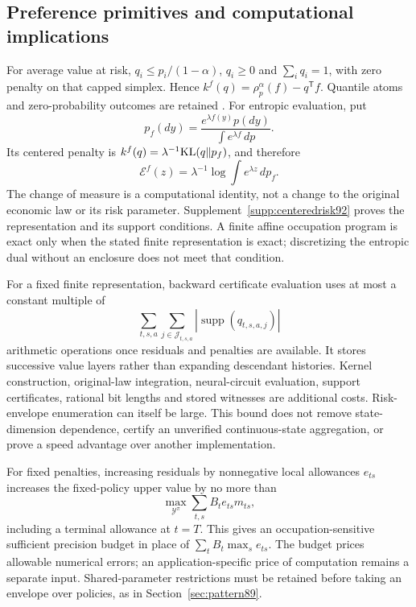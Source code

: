 \subsection{Preference primitives and computational implications}
For average value at risk, $q_i\le p_i/(1-\alpha)$, $q_i\ge0$ and $\sum_iq_i=1$, with zero penalty on that capped simplex. Hence $k^f(q)=\rho_p^\alpha(f)-q^{\mathsf T}f$. Quantile atoms and zero-probability outcomes are retained \citep{rockafellaruryasev2002}. For entropic evaluation, put
\[
 p_f(dy)=\frac{e^{\lambda f(y)}p(dy)}{\int e^{\lambda f}\,dp}.
\]
Its centered penalty is $k^f(q)=\lambda^{-1}{\rm KL}(q\Vert p_f)$, and therefore
\begin{equation}\label{eq:entropic-center92}
 \mathcal E^f(z)=\lambda^{-1}\log\int e^{\lambda z}\,dp_f.
\end{equation}
The change of measure is a computational identity, not a change to the original economic law or its risk parameter. Supplement~\ref{supp:centeredrisk92} proves the representation and its support conditions. A finite affine occupation program is exact only when the stated finite representation is exact; discretizing the entropic dual without an enclosure does not meet that condition.

For a fixed finite representation, backward certificate evaluation uses at most a constant multiple of
\[
 \sum_{t,s,a}\sum_{j\in\mathcal J_{t,s,a}}
       |\operatorname{supp}(q_{t,s,a,j})|
\]
arithmetic operations once residuals and penalties are available. It stores successive value layers rather than expanding descendant histories. Kernel construction, original-law integration, neural-circuit evaluation, support certificates, rational bit lengths and stored witnesses are additional costs. Risk-envelope enumeration can itself be large. This bound does not remove state-dimension dependence, certify an unverified continuous-state aggregation, or prove a speed advantage over another implementation.

For fixed penalties, increasing residuals by nonnegative local allowances $e_{ts}$ increases the fixed-policy upper value by no more than
\begin{equation}\label{eq:occupation-budget92}
 \max_{\mathcal Y^\pi}\sum_{t,s}B_t e_{ts}m_{ts},
\end{equation}
including a terminal allowance at $t=T$. This gives an occupation-sensitive sufficient precision budget in place of $\sum_t B_t\max_s e_{ts}$. The budget prices allowable numerical errors; an application-specific price of computation remains a separate input. Shared-parameter restrictions must be retained before taking an envelope over policies, as in Section~\ref{sec:pattern89}.


